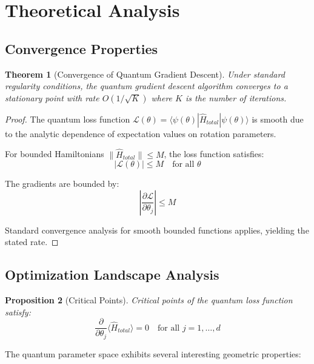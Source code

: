 \documentclass[11pt]{article}
\newtheorem{theorem}{Theorem}[section]
\newtheorem{proposition}[theorem]{Proposition}
\begin{document}
\section{Theoretical Analysis}

\subsection{Convergence Properties}

\begin{theorem}[Convergence of Quantum Gradient Descent]
Under standard regularity conditions, the quantum gradient descent algorithm converges to a stationary point with rate $O(1/\sqrt{K})$ where $K$ is the number of iterations.
\end{theorem}

\begin{proof}
The quantum loss function $\mathcal{L}(\theta) = \langle \psi(\theta) | \hat{H}_{total} | \psi(\theta) \rangle$ is smooth due to the analytic dependence of expectation values on rotation parameters.

For bounded Hamiltonians $\|\hat{H}_{total}\| \leq M$, the loss function satisfies:
\begin{equation}
|\mathcal{L}(\theta)| \leq M \quad \text{for all } \theta
\end{equation}

The gradients are bounded by:
\begin{equation}
\left|\frac{\partial \mathcal{L}}{\partial \theta_j}\right| \leq M
\end{equation}

Standard convergence analysis for smooth bounded functions applies, yielding the stated rate.
\end{proof}

\subsection{Optimization Landscape Analysis}

\begin{proposition}[Critical Points]
Critical points of the quantum loss function satisfy:
\begin{equation}
\frac{\partial}{\partial \theta_j} \langle \hat{H}_{total} \rangle = 0 \quad \text{for all } j = 1, \ldots, d
\end{equation}
\end{proposition}

The quantum parameter space exhibits several interesting geometric properties:
\end{document}
